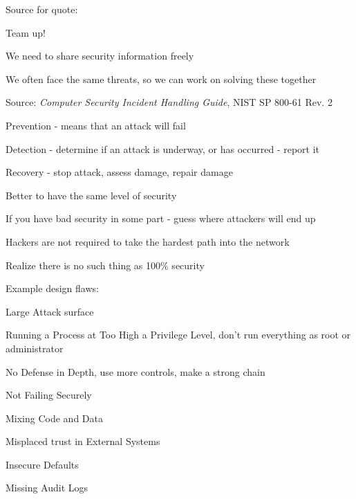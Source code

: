 \documentclass[Screen16to9,17pt]{foils}
\begin{document}
Source for quote: 




\begin{list1}
\item Team up!
\item We need to share security information freely
\item We often face the same threats, so we can work on solving these together
\end{list1}


{\footnotesize Source: \emph{Computer Security Incident Handling Guide}, NIST SP 800-61 Rev. 2}


\begin{list1}
\item Prevention - means that an attack will fail
\item Detection - determine if an attack is underway, or has occurred - report it
\item Recovery - stop attack, assess damage, repair damage
\end{list1}





\begin{list1}
\item Better to have the same level of security
\item If you have bad security in some part - guess where attackers will end up
\item Hackers are not required to take the hardest path into the network
\item Realize there is no such thing as 100\% security
\end{list1}



Example design flaws:
\begin{list2}
\item Large Attack surface
\item Running a Process at Too High a Privilege Level, don't run everything as root or administrator
\item No Defense in Depth, use more controls, make a strong chain
\item Not Failing Securely
\item Mixing Code and Data
\item Misplaced trust in External Systems
\item Insecure Defaults
\item Missing Audit Logs
\end{list2}
\end{document}
